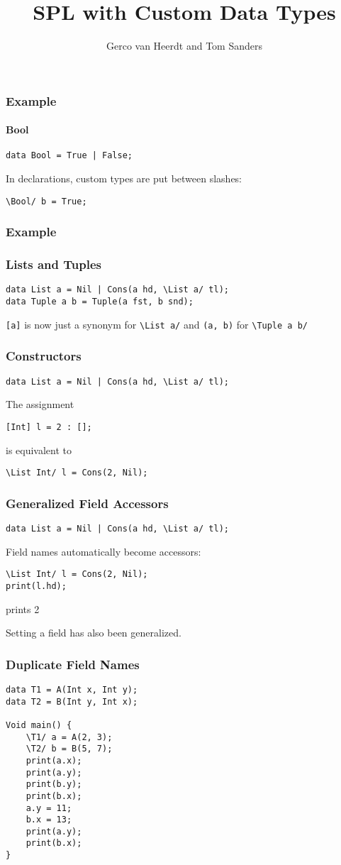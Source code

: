 \documentclass[12pt]{beamer}
\title{SPL with Custom Data Types}
\author{Gerco van Heerdt and Tom Sanders}
\begin{document}
\frame{\titlepage}

\begin{frame}[fragile]
    \frametitle{Example}
    \framesubtitle{Bool}
    \begin{verbatim}
data Bool = True | False;\end{verbatim}
    In declarations, custom types are put between slashes:
    \begin{verbatim}
\Bool/ b = True;\end{verbatim}
\end{frame}

\begin{frame}[fragile]
    \frametitle{Example}
    \frametitle{Lists and Tuples}
    \begin{verbatim}
data List a = Nil | Cons(a hd, \List a/ tl);
data Tuple a b = Tuple(a fst, b snd);\end{verbatim}
    \verb+[a]+ is now just a synonym for \verb+\List a/+ and \verb+(a, b)+ for \verb+\Tuple a b/+
\end{frame}

\begin{frame}[fragile]
    \frametitle{Constructors}
    \begin{verbatim}
data List a = Nil | Cons(a hd, \List a/ tl);\end{verbatim}
    The assignment
    \begin{verbatim}
[Int] l = 2 : [];\end{verbatim}
    is equivalent to
    \begin{verbatim}
\List Int/ l = Cons(2, Nil);\end{verbatim}
\end{frame}

\begin{frame}[fragile]
    \frametitle{Generalized Field Accessors}
    \begin{verbatim}
data List a = Nil | Cons(a hd, \List a/ tl);\end{verbatim}
    Field names automatically become accessors:
    \begin{verbatim}
\List Int/ l = Cons(2, Nil);
print(l.hd);\end{verbatim}
    prints 2

    Setting a field has also been generalized.
\end{frame}

\begin{frame}[fragile]
    \frametitle{Duplicate Field Names}
    \begin{verbatim}
data T1 = A(Int x, Int y);
data T2 = B(Int y, Int x);

Void main() {
    \T1/ a = A(2, 3);
    \T2/ b = B(5, 7);
    print(a.x);
    print(a.y);
    print(b.y);
    print(b.x);
    a.y = 11;
    b.x = 13;
    print(a.y);
    print(b.x);
}\end{verbatim}
\end{frame}
\end{document}
